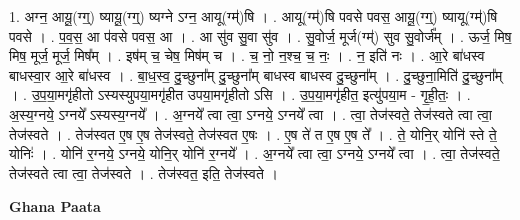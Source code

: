 \documentclass[17pt]{extarticle}
\begin{document}
1. अग्न॒ आयू॒(ग्ग्॒) ष्यायू॒(ग्ग्॒) ष्यग्ने ऽग्न॒ आयू(ग्म्॑)षि । . आयू(ग्म्॑)षि पवसे पवस॒ आयू॒(ग्ग्॒) ष्यायू(ग्म्॑)षि पवसे । . प॒व॒स॒ आ प॑वसे पवस॒ आ । . आ सु॑व सु॒वा सु॑व । . सु॒वोर्ज॒ मूर्ज(ग्म्॑) सुव सु॒वोर्ज᳚म् । . ऊर्ज॒ मिष॒ मिष॒ मूर्ज॒ मूर्ज॒ मिष᳚म् । . इष॑म् च॒ चेष॒ मिष॑म् च । . च॒ नो॒ न॒श्च॒ च॒ नः॒ । . न॒ इति॑ नः । . आ॒रे बा॑धस्व बाधस्वा॒र आ॒रे बा॑धस्व । . बा॒ध॒स्व॒ दु॒च्छुना᳚म् दु॒च्छुना᳚म् बाधस्व बाधस्व दु॒च्छुना᳚म् । . दु॒च्छुना॒मिति॑ दु॒च्छुना᳚म् । . उ॒प॒या॒मगृ॑हीतो ऽस्यस्युपया॒मगृ॑हीत उपया॒मगृ॑हीतो ऽसि । . उ॒प॒या॒मगृ॑हीत॒ इत्यु॑पया॒म - गृ॒ही॒तः॒ । . अ॒स्य॒ग्नये॒ ऽग्नये᳚ ऽस्यस्य॒ग्नये᳚ । . अ॒ग्नये᳚ त्वा त्वा॒ ऽग्नये॒ ऽग्नये᳚ त्वा । . त्वा॒ तेज॑स्वते॒ तेज॑स्वते त्वा त्वा॒ तेज॑स्वते । . तेज॑स्वत ए॒ष ए॒ष तेज॑स्वते॒ तेज॑स्वत ए॒षः । . ए॒ष ते॑ त ए॒ष ए॒ष ते᳚ । . ते॒ योनि॒र् योनि॑ स्ते ते॒ योनिः॑ । . योनि॑ र॒ग्नये॒ ऽग्नये॒ योनि॒र् योनि॑ र॒ग्नये᳚ । . अ॒ग्नये᳚ त्वा त्वा॒ ऽग्नये॒ ऽग्नये᳚ त्वा । . त्वा॒ तेज॑स्वते॒ तेज॑स्वते त्वा त्वा॒ तेज॑स्वते । . तेज॑स्वत॒ इति॒ तेज॑स्वते । \newline

\textbf{Ghana Paata } \newline
\end{document}
